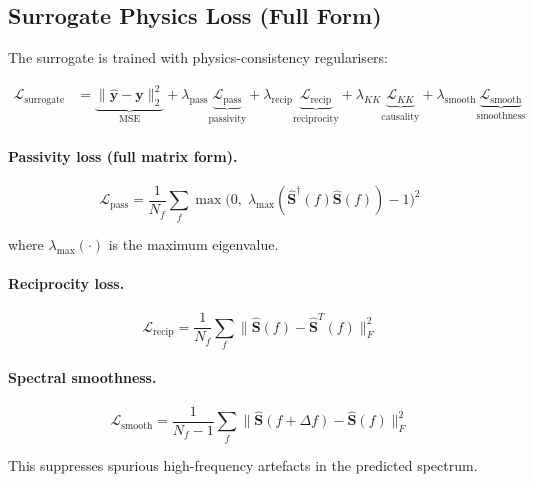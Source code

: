 \documentclass[12pt,a4paper]{article}
\newcommand{\yhat}{\hat{\mathbf{y}}}
\newcommand{\Smat}{\mathbf{S}}
\theoremstyle{definition}
\theoremstyle{plain}
\theoremstyle{remark}
\begin{document}
\subsection{Surrogate Physics Loss (Full Form)}

The surrogate is trained with physics-consistency regularisers:

\begin{align}
  \mathcal{L}_{\mathrm{surrogate}}
  &= \underbrace{\|\yhat - \mathbf{y}\|_2^2}_{\mathrm{MSE}}
   + \lambda_{\mathrm{pass}} \underbrace{\mathcal{L}_{\mathrm{pass}}}_{\mathrm{passivity}}
   + \lambda_{\mathrm{recip}} \underbrace{\mathcal{L}_{\mathrm{recip}}}_{\mathrm{reciprocity}}
   + \lambda_{KK} \underbrace{\mathcal{L}_{KK}}_{\mathrm{causality}}
   + \lambda_{\mathrm{smooth}} \underbrace{\mathcal{L}_{\mathrm{smooth}}}_{\mathrm{smoothness}}
  \label{eq:lsurr}
\end{align}

\paragraph{Passivity loss (full matrix form).}
\begin{equation}
  \mathcal{L}_{\mathrm{pass}}
  = \frac{1}{N_f}\sum_f
    \max\!\bigl(0,\; \lambda_{\max}(\hat{\Smat}^\dagger(f)\hat{\Smat}(f)) - 1\bigr)^2
  \label{eq:lpass}
\end{equation}

where $\lambda_{\max}(\cdot)$ is the maximum eigenvalue.

\paragraph{Reciprocity loss.}
\begin{equation}
  \mathcal{L}_{\mathrm{recip}}
  = \frac{1}{N_f}\sum_f \|\hat{\Smat}(f) - \hat{\Smat}^T(f)\|_F^2
  \label{eq:lrecip}
\end{equation}

\paragraph{Spectral smoothness.}
\begin{equation}
  \mathcal{L}_{\mathrm{smooth}}
  = \frac{1}{N_f - 1}\sum_f
    \|\hat{\Smat}(f+\Delta f) - \hat{\Smat}(f)\|_F^2
  \label{eq:lsmooth}
\end{equation}

This suppresses spurious high-frequency artefacts in the predicted spectrum.
\end{document}

